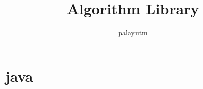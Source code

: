 \documentclass[a4paper,11pt]{article}
\author{palayutm}
\title{Algorithm Library}
\begin{document}
 
\maketitle %
\newpage %
\tableofcontents %

\newpage
\section{java} %
\inputminted[breaklines]{java}{java/大数二分.java} %
\inputminted[breaklines]{java}{java/加减乘除等.java} %
\inputminted[breaklines]{java}{java/开头.java} %
\inputminted[breaklines]{java}{java/判大素数.java %

\newpage
\section{python} %
\inputminted[breaklines]{python}{python/计算表达式.py} %
\inputminted[breaklines]{python}{python/正则表达式.py} %

\newpage
\section{动态规划} %
\inputminted[breaklines]{c++}{动态规划/数位DP.cpp} %

\newpage
\section{基本操作} %
\inputminted[breaklines]{c++}{基本操作/bitset.cpp} %
\inputminted[breaklines]{c++}{基本操作/二进制枚举.cpp} %
\inputminted[breaklines]{c++}{基本操作/高斯消元.cpp} %
\inputminted[breaklines]{c++}{基本操作/矩阵快速幂.cpp} %
\inputminted[breaklines]{c++}{基本操作/状态压缩.cpp} %
\subsection{离散化} %
\inputminted[breaklines]{c++}{基本操作/离散化/一维线离散化.cpp} %
\inputminted[breaklines]{c++}{基本操作/离散化/二维点离散化.cpp} %

\newpage
\section{计算几何} %
\subsection{叉积} %
\inputminted[breaklines]{c++}{计算几何/叉积/点线式.cpp} %
\inputminted[breaklines]{c++}{计算几何/叉积/重载版.cpp} %
\inputminted[breaklines]{c++}{计算几何/叉积/叉积算多边形面积.cpp} %
}
\end{document}
